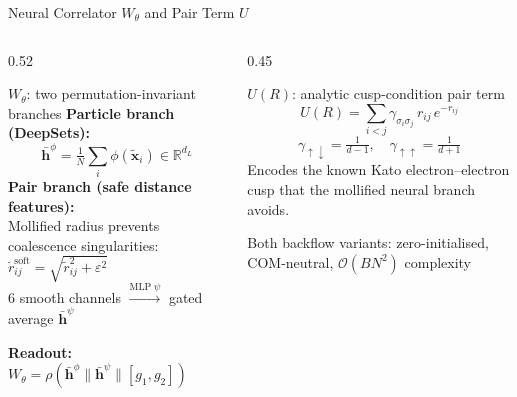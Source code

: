 \documentclass[aspectratio=169,10pt]{beamer}
\begin{document}
\begin{frame}{Neural Correlator $W_\theta$ and Pair Term $U$}
  \begin{columns}[T]
    \begin{column}{0.52\textwidth}
      \begin{block}{$W_\theta$: two permutation-invariant branches}
        \textbf{Particle branch (DeepSets):}
        \[
          \bar{\mathbf{h}}^\phi
          = \tfrac{1}{N}\textstyle\sum_i \phi(\tilde{\mathbf{x}}_i)
          \in \mathbb{R}^{d_L}
        \]
        \textbf{Pair branch (safe distance features):}\\
        Mollified radius prevents coalescence singularities:
        $\tilde r^\text{soft}_{ij} = \sqrt{\tilde r_{ij}^2+\varepsilon^2}$\\
        6 smooth channels $\xrightarrow{\text{MLP}\;\psi}$
        gated average $\bar{\mathbf{h}}^\psi$
        \smallskip

        \textbf{Readout:}
        $W_\theta = \rho(\bar{\mathbf{h}}^\phi \| \bar{\mathbf{h}}^\psi \| [g_1,g_2])$
      \end{block}
    \end{column}
    \begin{column}{0.45\textwidth}
      \begin{block}{$U(R)$: analytic cusp-condition pair term}
        \[
          U(R) = \sum_{i<j}
          \gamma_{\sigma_i\sigma_j}\, r_{ij}\, e^{-r_{ij}}
        \]
        \[
          \gamma_{\uparrow\downarrow}=\tfrac{1}{d-1},\quad
          \gamma_{\uparrow\uparrow}=\tfrac{1}{d+1}
        \]
        Encodes the known Kato electron--electron cusp that
        the mollified neural branch avoids.
      \end{block}
      \medskip
      \small
      \textcolor{uioblue}{Both backflow variants:
        zero-initialised, COM-neutral,
        $\mathcal{O}(BN^2)$ complexity}
    \end{column}
  \end{columns}
\end{frame}
\end{document}
